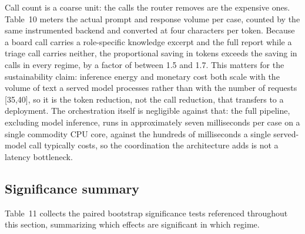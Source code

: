 \documentclass[12pt]{article}
\begin{document}
Call count is a coarse unit: the calls the router removes are the expensive ones. Table~10 meters the actual prompt and response volume per case, counted by the same instrumented backend and converted at four characters per token. Because a board call carries a role-specific knowledge excerpt and the full report while a triage call carries neither, the proportional saving in tokens exceeds the saving in calls in every regime, by a factor of between 1.5 and 1.7. This matters for the sustainability claim: inference energy and monetary cost both scale with the volume of text a served model processes rather than with the number of requests [35,40], so it is the token reduction, not the call reduction, that transfers to a deployment. The orchestration itself is negligible against that: the full pipeline, excluding model inference, runs in approximately seven milliseconds per case on a single commodity CPU core, against the hundreds of milliseconds a single served-model call typically costs, so the coordination the architecture adds is not a latency bottleneck.

\subsection{Significance summary}

Table~11 collects the paired bootstrap significance tests referenced throughout this section, summarizing which effects are significant in which regime.
\end{document}
